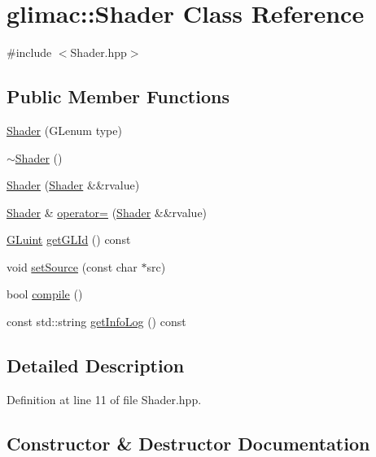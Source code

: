 \hypertarget{classglimac_1_1_shader}{}\section{glimac\+:\+:Shader Class Reference}
\label{classglimac_1_1_shader}


{\ttfamily \#include $<$Shader.\+hpp$>$}

\subsection*{Public Member Functions}
\begin{DoxyCompactItemize}
\item 
\hyperlink{classglimac_1_1_shader_a064a1d24851c1c405d3c912cff9521c4}{Shader} (G\+Lenum type)
\item 
\hyperlink{classglimac_1_1_shader_ac36c2fedf8587caaf131ca164d737758}{$\sim$\+Shader} ()
\item 
\hyperlink{classglimac_1_1_shader_a98bf794b782f89a7a5c859607e6dc62b}{Shader} (\hyperlink{classglimac_1_1_shader}{Shader} \&\&rvalue)
\item 
\hyperlink{classglimac_1_1_shader}{Shader} \& \hyperlink{classglimac_1_1_shader_a0790eeb7a9fc154161bee6b78e287828}{operator=} (\hyperlink{classglimac_1_1_shader}{Shader} \&\&rvalue)
\item 
\hyperlink{dummy_8cpp_aa311c7f0d6ec4f1a33f9235c3651b86b}{G\+Luint} \hyperlink{classglimac_1_1_shader_a46c21c4b6b9ee89426b458695897202e}{get\+G\+L\+Id} () const
\item 
void \hyperlink{classglimac_1_1_shader_a66701118e7f1d789a258936c82b32874}{set\+Source} (const char $\ast$src)
\item 
bool \hyperlink{classglimac_1_1_shader_a1e6c6814a6275dd698b3befdb89aa647}{compile} ()
\item 
const std\+::string \hyperlink{classglimac_1_1_shader_aa0de6702041087187d8eca874000cfa6}{get\+Info\+Log} () const
\end{DoxyCompactItemize}


\subsection{Detailed Description}


Definition at line 11 of file Shader.\+hpp.



\subsection{Constructor \& Destructor Documentation}
\mbox{\label{classglimac_1_1_shader_a064a1d24851c1c405d3c912cff9521c4}} 
